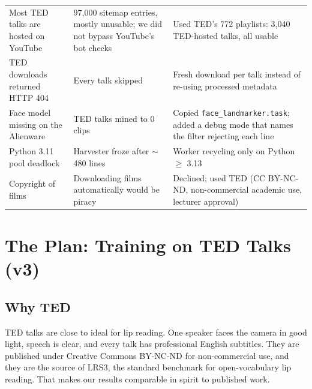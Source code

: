 \documentclass[11pt,a4paper]{article}
\newcommand{\code}[1]{\texttt{\small #1}}
\begin{document}
{\begin{longtable}{@{}L{3.3cm}L{4.0cm}L{6.9cm}@{}}
Most TED talks are hosted on YouTube & 97,000 sitemap entries, mostly unusable; we did not bypass YouTube's bot checks & Used TED's 772 playlists: 3,040 TED-hosted talks, all usable \\
TED downloads returned HTTP 404 & Every talk skipped & Fresh download per talk instead of re-using processed metadata \\
Face model missing on the Alienware & TED talks mined to 0 clips & Copied \code{face\_landmarker.task}; added a debug mode that names the filter rejecting each line \\
Python 3.11 pool deadlock & Harvester froze after $\sim$480 lines & Worker recycling only on Python $\ge$ 3.13 \\
Copyright of films & Downloading films automatically would be piracy & Declined; used TED (CC BY-NC-ND, non-commercial academic use, lecturer approval) \\
\bottomrule
\end{longtable}
}

\section{The Plan: Training on TED Talks (v3)}
\label{sec:ted}
\subsection{Why TED}
TED talks are close to ideal for lip reading. One speaker faces the camera in good light,
speech is clear, and every talk has professional English subtitles. They are published under
Creative Commons BY-NC-ND for non-commercial use, and they are the source of LRS3, the
standard benchmark for open-vocabulary lip reading. That makes our results comparable in
spirit to published work.
\end{document}
